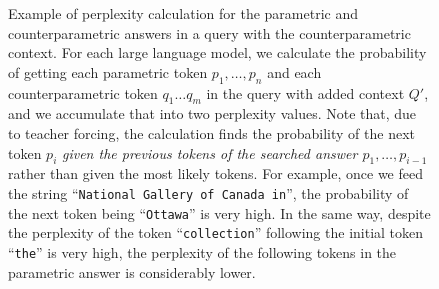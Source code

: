 \begin{figure}[p]

	\caption{Example of perplexity calculation for the parametric and counterparametric answers in a query with the counterparametric context. For each large language model, we calculate the probability of getting each parametric token $p_1, \dots, p_n$ and each counterparametric token $q_1 \dots q_m$ in the query with added context $Q'$, and we accumulate that into two perplexity values. Note that, due to teacher forcing, the calculation finds the probability of the next token $p_i$ \textit{given the previous tokens of the searched answer $p_1, \dots, p_{i - 1}$} rather than given the most likely tokens. For example, once we feed the string ``\texttt{National Gallery of Canada in}'', the probability of the next token being ``\texttt{Ottawa}'' is very high. In the same way, despite the perplexity of the token ``\texttt{collection}'' following the initial token ``\texttt{the}'' is very high, the perplexity of the following tokens in the parametric answer is considerably lower.}
	\label{example_perplexity}
\end{figure}
